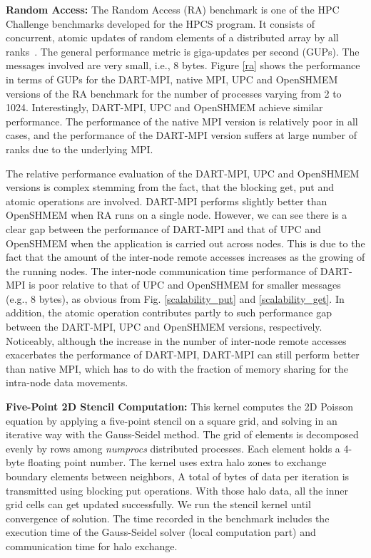 \documentclass{llncs}
\begin{document}
{\noindent \textbf{Random Access:} The Random Access (RA) benchmark\cite{ra_rule} is one of the HPC
Challenge benchmarks developed for the HPCS program.  
It consists of concurrent, atomic updates of random elements of a
distributed array by all ranks~\cite{shmem_ra}. 
The general performance metric is
giga-updates per second (GUPs). The messages involved are very
small, i.e., 8 bytes.  Figure \ref{ra} shows the performance in terms
of GUPs
for the DART-MPI, native MPI, UPC and OpenSHMEM versions of 
the RA benchmark for
the number of processes varying from 2 to 1024. 
Interestingly, DART-MPI, UPC and OpenSHMEM achieve similar performance.
The performance of the native MPI version is relatively poor in all cases, and the
performance of the DART-MPI version suffers at large number of ranks due to the
underlying MPI.


The relative performance evaluation of the DART-MPI, UPC and OpenSHMEM
versions is complex stemming from the fact, that the blocking get, put
and atomic operations are involved.
\mbox{DART-MPI} performs slightly better than OpenSHMEM when RA runs
on a single node.  However, we can see there is a clear gap
between the performance of \mbox{DART-MPI} and that of UPC and OpenSHMEM when the
application is carried out across nodes. This is due to the fact that
the amount of the \mbox{inter-node} remote accesses increases as
the growing of the running nodes. The \mbox{inter-node}
communication time performance of \mbox{DART-MPI} is poor relative to
that of UPC and OpenSHMEM for smaller messages (e.g., 8 bytes), as
obvious from Fig. \ref{scalability_put} and
\ref{scalability_get}. 
In addition, the atomic operation contributes
partly to such performance gap between the \mbox{DART-MPI}, UPC and
OpenSHMEM versions, respectively. Noticeably, 
although the increase in the number of inter-node remote accesses
exacerbates the performance of DART-MPI, DART-MPI can
still perform better than native MPI, which has to do with the fraction of memory sharing 
for the intra-node data movements.


\noindent \textbf{Five-Point 2D Stencil Computation:} 
This kernel computes the 2D Poisson equation by applying a \mbox{five-point} stencil on a square grid,
and solving in an iterative way with the \mbox{Gauss-Seidel} method. 
The grid of  elements is decomposed evenly by rows among \textit{numprocs} distributed
processes. Each element holds a \mbox{4-byte} floating point number.
The kernel uses extra halo zones to exchange boundary elements between neighbors,
A total of   bytes
of data per iteration is transmitted using blocking put operations. 
With those halo data, all the inner grid cells can get updated
successfully. We run the stencil kernel until convergence of
solution. The time recorded in the benchmark includes the execution
time of the  Gauss-Seidel solver (local computation part) and
communication time for halo exchange.

}
\end{document}
